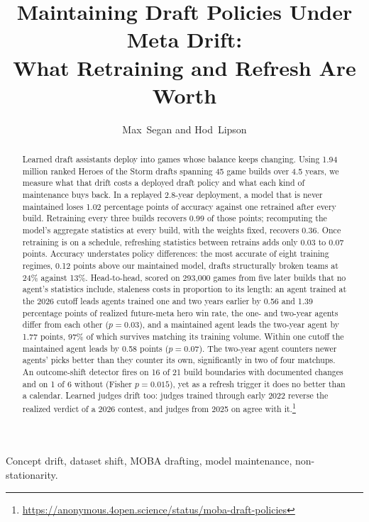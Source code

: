 \documentclass[journal]{IEEEtran}
\newif\ifanonymous
\newcommand{\repourl}{\url{https://anonymous.4open.science/status/moba-draft-policies}}
\newcommand{\repourl}{\url{https://github.com/maxsegan/moba-draft-policies}}
\begin{document}
\title{Maintaining Draft Policies Under Meta Drift:\\ What Retraining and Refresh Are Worth}
\ifanonymous
\author{Anonymous Authors}
\else
\author{Max~Segan and Hod~Lipson}
\fi
\maketitle

\begin{abstract}
Learned draft assistants deploy into games whose balance keeps changing.
Using 1.94 million ranked Heroes of the Storm drafts spanning 45 game
builds over 4.5 years, we measure what that drift costs a deployed draft
policy and what each kind of maintenance buys back. In a replayed
2.8-year deployment, a model that is never maintained loses 1.02
percentage points of accuracy against one retrained after every build.
Retraining every three builds recovers 0.99 of those points; recomputing
the model's aggregate statistics at every build, with the weights fixed,
recovers 0.36. Once retraining is on a schedule, refreshing statistics
between retrains adds only 0.03 to 0.07 points. Accuracy understates
policy differences: the most accurate of eight training regimes, 0.12
points above our maintained model, drafts structurally broken teams at
24\% against 13\%. Head-to-head, scored on 293{,}000 games from five
later builds that no agent's statistics include, staleness costs in
proportion to its length: an agent trained at the 2026 cutoff leads
agents trained one and two years earlier by 0.56 and 1.39 percentage
points of realized future-meta hero win rate, the one- and two-year
agents differ from each other ($p = 0.03$), and a maintained agent leads
the two-year agent by 1.77 points, 97\% of which survives matching its
training volume. Within one cutoff the maintained agent leads by 0.58
points ($p = 0.07$). The two-year agent counters newer agents' picks
better than they counter its own, significantly in two of four
matchups. An outcome-shift
detector fires on 16 of 21 build boundaries with documented changes and
on 1 of 6 without (Fisher $p = 0.015$), yet as a refresh trigger it does
no better than a calendar. Learned judges drift too: judges trained
through early 2022 reverse the realized verdict of a 2026 contest, and
judges from 2025 on agree with it.\footnote{\repourl}
\end{abstract}

\begin{IEEEkeywords}
Concept drift, dataset shift, MOBA drafting, model maintenance,
non-stationarity.
\end{IEEEkeywords}
\end{document}
